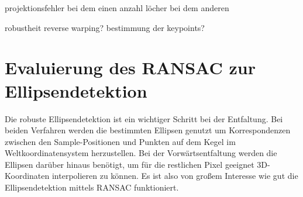 \bigskip\bigskip

projektionsfehler bei dem einen
anzahl löcher bei dem anderen



robustheit reverse warping? bestimmung der keypoints?







\section{Evaluierung des RANSAC zur Ellipsendetektion}
Die robuste Ellipsendetektion ist ein wichtiger Schritt bei der Entfaltung. Bei beiden Verfahren werden die bestimmten Ellipsen genutzt um Korrespondenzen zwischen den Sample-Positionen und Punkten auf dem Kegel im Weltkoordinatensystem herzustellen. Bei der Vorwärtsentfaltung werden die Ellipsen darüber hinaus benötigt, um für die restlichen Pixel geeignet 3D-Koordinaten interpolieren zu können. Es ist also von großem Interesse wie gut die Ellipsendetektion mittels RANSAC funktioniert.  


